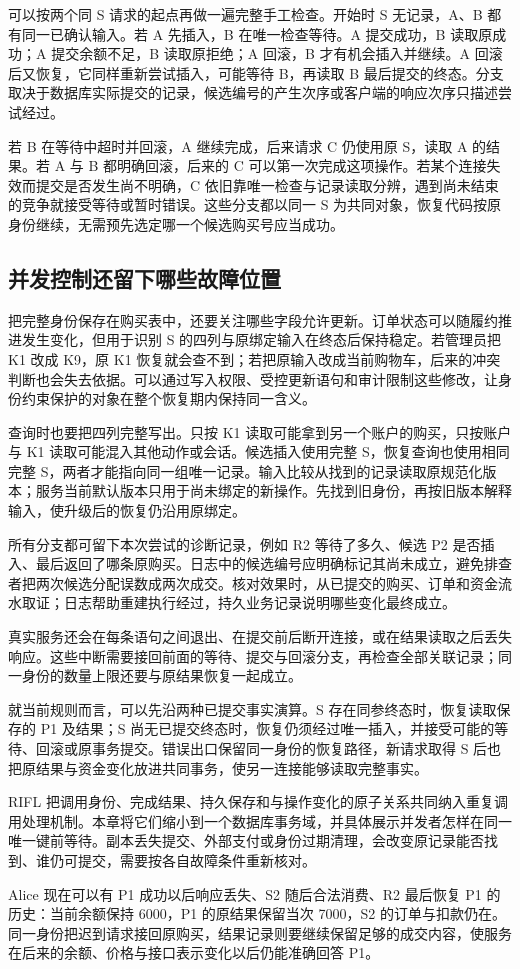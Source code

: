 可以按两个同 S 请求的起点再做一遍完整手工检查。开始时 S 无记录，A、B 都有同一已确认输入。若 A 先插入，B 在唯一检查等待。A 提交成功，B 读取原成功；A 提交余额不足，B 读取原拒绝；A 回滚，B 才有机会插入并继续。A 回滚后又恢复，它同样重新尝试插入，可能等待 B，再读取 B 最后提交的终态。分支取决于数据库实际提交的记录，候选编号的产生次序或客户端的响应次序只描述尝试经过。

若 B 在等待中超时并回滚，A 继续完成，后来请求 C 仍使用原 S，读取 A 的结果。若 A 与 B 都明确回滚，后来的 C 可以第一次完成这项操作。若某个连接失效而提交是否发生尚不明确，C 依旧靠唯一检查与记录读取分辨，遇到尚未结束的竞争就接受等待或暂时错误。这些分支都以同一 S 为共同对象，恢复代码按原身份继续，无需预先选定哪一个候选购买号应当成功。

\subsection*{并发控制还留下哪些故障位置}

把完整身份保存在购买表中，还要关注哪些字段允许更新。订单状态可以随履约推进发生变化，但用于识别 S 的四列与原绑定输入在终态后保持稳定。若管理员把 K1 改成 K9，原 K1 恢复就会查不到；若把原输入改成当前购物车，后来的冲突判断也会失去依据。可以通过写入权限、受控更新语句和审计限制这些修改，让身份约束保护的对象在整个恢复期内保持同一含义。

查询时也要把四列完整写出。只按 K1 读取可能拿到另一个账户的购买，只按账户与 K1 读取可能混入其他动作或会话。候选插入使用完整 S，恢复查询也使用相同完整 S，两者才能指向同一组唯一记录。输入比较从找到的记录读取原规范化版本；服务当前默认版本只用于尚未绑定的新操作。先找到旧身份，再按旧版本解释输入，使升级后的恢复仍沿用原绑定。

所有分支都可留下本次尝试的诊断记录，例如 R2 等待了多久、候选 P2 是否插入、最后返回了哪条原购买。日志中的候选编号应明确标记其尚未成立，避免排查者把两次候选分配误数成两次成交。核对效果时，从已提交的购买、订单和资金流水取证；日志帮助重建执行经过，持久业务记录说明哪些变化最终成立。

真实服务还会在每条语句之间退出、在提交前后断开连接，或在结果读取之后丢失响应。这些中断需要接回前面的等待、提交与回滚分支，再检查全部关联记录；同一身份的数量上限还要与原结果恢复一起成立。

就当前规则而言，可以先沿两种已提交事实演算。S 存在同参终态时，恢复读取保存的 P1 及结果；S 尚无已提交终态时，恢复仍须经过唯一插入，并接受可能的等待、回滚或原事务提交。错误出口保留同一身份的恢复路径，新请求取得 S 后也把原结果与资金变化放进共同事务，使另一连接能够读取完整事实。

RIFL 把调用身份、完成结果、持久保存和与操作变化的原子关系共同纳入重复调用处理机制\cite{rifl}。本章将它们缩小到一个数据库事务域，并具体展示并发者怎样在同一唯一键前等待。副本丢失提交、外部支付或身份过期清理，会改变原记录能否找到、谁仍可提交，需要按各自故障条件重新核对。

Alice 现在可以有 P1 成功以后响应丢失、S2 随后合法消费、R2 最后恢复 P1 的历史：当前余额保持 6000，P1 的原结果保留当次 7000，S2 的订单与扣款仍在。同一身份把迟到请求接回原购买，结果记录则要继续保留足够的成交内容，使服务在后来的余额、价格与接口表示变化以后仍能准确回答 P1。
\FloatBarrier
